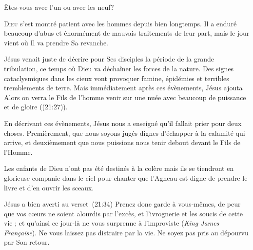 Êtes-vous avec l'un ou avec les neuf?

\dvrule







\lettrine{D}{ieu} s'est montré patient avec les hommes
 depuis bien longtemps.
 Il a enduré beaucoup d'abus et énormément
 de mauvais traitements de leur part,
 mais le jour vient où Il va prendre Sa revanche.

Jésus venait juste de décrire pour Ses disciples la période
 de la grande tribulation, ce temps où Dieu va déchaîner les forces
 de la nature. Des signes cataclysmiques dans les cieux vont provoquer famine,
 épidémies et terribles tremblements de terre.
 Mais immédiatement après ces évènements, Jésus ajouta\frcolon{} 
 \Og Alors on verra le Fils de l'homme venir sur une nuée avec beaucoup
 de puissance et de gloire \Fg{} ((21:27)).


En décrivant ces évènements, Jésus nous a enseigné qu'il fallait prier pour deux choses.
 Premièrement, que nous soyons jugés dignes d'échapper à la calamité
 qui arrive, et deuxièmement que nous puissions nous tenir debout
 devant le Fils de l'Homme.

Les enfants de Dieu n'ont pas été destinés à la colère mais ils se tiendront
 en glorieuse companie dans le ciel pour chanter que l'Agneau
 est digne de prendre le livre et d'en ouvrir les sceaux.

Jésus a bien averti au verset~(21:34)\frcolon{} 
 \Og Prenez donc garde à vous-mêmes, de peur que vos c\oe{}urs ne soient
 alourdis par l’excès, et l’ivrognerie et les soucis de cette vie ;
 et qu'ainsi ce jour-là ne vous surprenne à l’improviste \Fg{}
 (\textit{King James Fran\c{c}aise}).
 Ne vous laissez pas distraire par la vie.
 Ne soyez pas pris au dépourvu par Son retour.

